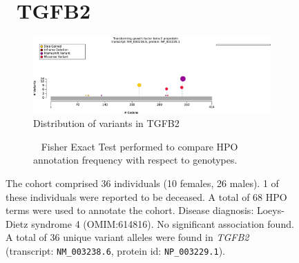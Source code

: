 \begin{figure}[htbp]
\section*{ TGFB2}
\centering
\begin{subfigure}[b]{0.95\textwidth}
\centering
\includegraphics[width=\textwidth]{ img/TGFB2_protein_diagram.pdf} 
\captionsetup{justification=raggedright,singlelinecheck=false}
\caption{Distribution of variants in TGFB2}
\end{subfigure}

\vspace{2em}

\begin{subfigure}[b]{0.95\textwidth}
\centering
{}
\captionsetup{justification=raggedright,singlelinecheck=false}
\caption{             Fisher Exact Test performed to compare HPO annotation frequency with respect to genotypes. }
\end{subfigure}

\vspace{2em}

\caption{ The cohort comprised 36 individuals (10 females, 26 males). 1 of these individuals were reported to be deceased. A total of 68 HPO terms were used to annotate the cohort. Disease diagnosis: Loeys-Dietz syndrome 4 (OMIM:614816). No significant association found. A total of 36 unique variant alleles were found in \textit{TGFB2} (transcript: \texttt{NM\_003238.6}, protein id: \texttt{NP\_003229.1}).}
\end{figure}
